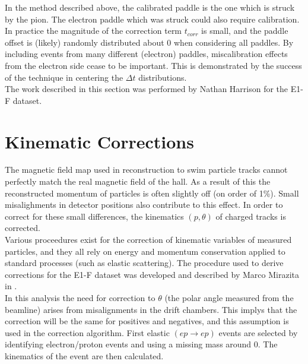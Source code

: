 
In the method described above, the calibrated paddle is the one which is struck by the pion.  The electron paddle which was struck could also require calibration.  In practice the magnitude of the correction term $t_{corr}$ is small, and the paddle offset is (likely) randomly distributed about 0 when considering all paddles.  By including events from many different (electron) paddles, miscalibration effects from the electron side cease to be important.  This is demonstrated by the success of the technique in centering the $\Delta t$ distributions.  \\

The work described in this section was performed by Nathan Harrison for the E1-F dataset.

\section{Kinematic Corrections}
The magnetic field map used in reconstruction to swim particle tracks cannot perfectly match the real magnetic field of the hall.  As a result of this the reconstructed momentum of particles is often slightly off (on order of 1\%).  Small misalighments in detector positions also contribute to this effect.  In order to correct for these small differences, the kinematics $(p, \theta)$ of charged tracks is corrected. \\

Various proceedures exist for the correction of kinematic variables of measured particles, and they all rely on energy and momentum conservation applied to standard processes (such as elastic scattering).  The procedure used to derive corrections for the E1-F dataset was developed and described by Marco Mirazita in \cite{physics-mirazita}.  \\

In this analysis the need for correction to $\theta$ (the polar angle measured from the beamline) arises from misalignments in the drift chambers.  This implys that the correction will be the same for positives and negatives, and this assumption is used in the correction algorithm.  First elastic $(ep \rightarrow ep)$ events are selected by identifying electron/proton events and using a missing mass around 0.  The kinematics of the event are then calculated.

